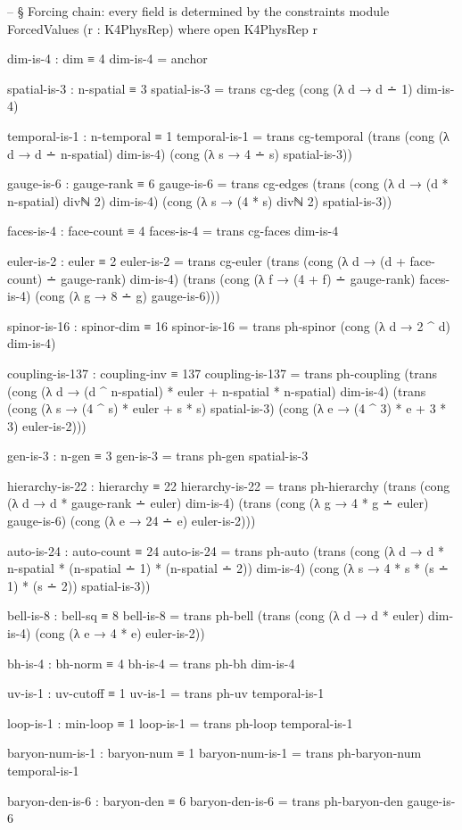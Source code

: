 \documentclass[11pt,a4paper]{book}
\begin{document}
\begin{code}
-- § Forcing chain: every field is determined by the constraints
module ForcedValues (r : K4PhysRep) where
  open K4PhysRep r

  dim-is-4 : dim ≡ 4
  dim-is-4 = anchor

  spatial-is-3 : n-spatial ≡ 3
  spatial-is-3 = trans cg-deg (cong (λ d → d ∸ 1) dim-is-4)

  temporal-is-1 : n-temporal ≡ 1
  temporal-is-1 = trans cg-temporal
    (trans (cong (λ d → d ∸ n-spatial) dim-is-4)
           (cong (λ s → 4 ∸ s) spatial-is-3))

  gauge-is-6 : gauge-rank ≡ 6
  gauge-is-6 = trans cg-edges
    (trans (cong (λ d → (d * n-spatial) divℕ 2) dim-is-4)
           (cong (λ s → (4 * s) divℕ 2) spatial-is-3))

  faces-is-4 : face-count ≡ 4
  faces-is-4 = trans cg-faces dim-is-4

  euler-is-2 : euler ≡ 2
  euler-is-2 = trans cg-euler
    (trans (cong (λ d → (d + face-count) ∸ gauge-rank) dim-is-4)
    (trans (cong (λ f → (4 + f) ∸ gauge-rank) faces-is-4)
           (cong (λ g → 8 ∸ g) gauge-is-6)))

  spinor-is-16 : spinor-dim ≡ 16
  spinor-is-16 = trans ph-spinor (cong (λ d → 2 ^ d) dim-is-4)

  coupling-is-137 : coupling-inv ≡ 137
  coupling-is-137 = trans ph-coupling
    (trans (cong (λ d → (d ^ n-spatial) * euler + n-spatial * n-spatial) dim-is-4)
    (trans (cong (λ s → (4 ^ s) * euler + s * s) spatial-is-3)
           (cong (λ e → (4 ^ 3) * e + 3 * 3) euler-is-2)))

  gen-is-3 : n-gen ≡ 3
  gen-is-3 = trans ph-gen spatial-is-3

  hierarchy-is-22 : hierarchy ≡ 22
  hierarchy-is-22 = trans ph-hierarchy
    (trans (cong (λ d → d * gauge-rank ∸ euler) dim-is-4)
    (trans (cong (λ g → 4 * g ∸ euler) gauge-is-6)
           (cong (λ e → 24 ∸ e) euler-is-2)))

  auto-is-24 : auto-count ≡ 24
  auto-is-24 = trans ph-auto
    (trans (cong (λ d → d * n-spatial * (n-spatial ∸ 1) * (n-spatial ∸ 2)) dim-is-4)
           (cong (λ s → 4 * s * (s ∸ 1) * (s ∸ 2)) spatial-is-3))

  bell-is-8 : bell-sq ≡ 8
  bell-is-8 = trans ph-bell
    (trans (cong (λ d → d * euler) dim-is-4)
           (cong (λ e → 4 * e) euler-is-2))

  bh-is-4 : bh-norm ≡ 4
  bh-is-4 = trans ph-bh dim-is-4

  uv-is-1 : uv-cutoff ≡ 1
  uv-is-1 = trans ph-uv temporal-is-1

  loop-is-1 : min-loop ≡ 1
  loop-is-1 = trans ph-loop temporal-is-1

  baryon-num-is-1 : baryon-num ≡ 1
  baryon-num-is-1 = trans ph-baryon-num temporal-is-1

  baryon-den-is-6 : baryon-den ≡ 6
  baryon-den-is-6 = trans ph-baryon-den gauge-is-6
\end{code}
\end{document}
